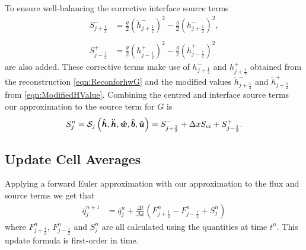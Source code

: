 To ensure well-balancing the corrective interface source terms
	\begin{align*}
	 S^{-}_{j + \frac{1}{2}} &=  \frac{g}{2} \left(\ddot{h}^{-}_{j + \frac{1}{2}} \right)^2 - \frac{g}{2} \left(h^{-}_{j + \frac{1}{2}} \right)^2, \\ \\
	  S^{+}_{j - \frac{1}{2}} &=  \frac{g}{2} \left(h^{+}_{j - \frac{1}{2}}\right)^2 - \frac{g}{2}\left(\ddot{h}^{+}_{j - \frac{1}{2}}\right)^2 
	\end{align*}
are also added. These corrective terms make use of $h^{-}_{j + \frac{1}{2}}$ and $h^{+}_{j + \frac{1}{2}}$ obtained from the reconstruction \eqref{eqn:ReconforhwG} and the modified values $\ddot{h}^{-}_{j + \frac{1}{2}}$ and $\ddot{h}^{+}_{j + \frac{1}{2}}$ from \eqref{eqn:ModifiedHValue}. Combining the centred and interface source terms our approximation to the source term for $G$ is 
\begin{equation*}
S^n_j = \mathcal{S}_j\left( \boldsymbol{\hat{h}},\boldsymbol{\ddot{h}},\boldsymbol{\hat{w}},\boldsymbol{\hat{b}}, \boldsymbol{\hat{u}}  \right)=   S^{-}_{j + \frac{1}{2}} + \Delta x S_{ci} + S^{+}_{j - \frac{1}{2}}.
\end{equation*}


\subsection{Update Cell Averages}
Applying a forward Euler approximation with our approximation to the flux and source terms we get that
\begin{align}
\overline{q}^{n+1}_j &= \overline{q}^{n}_j + \frac{\Delta t}{\Delta x} \left(F^n_{j+\frac{1}{2}} - F^n_{j-\frac{1}{2}} + S^n_j\right)
\label{eqn:UpdateMethod}
\end{align}
where $F^n_{j+\frac{1}{2}}$, $F^n_{j-\frac{1}{2}}$ and $S^n_j$ are all calculated using the quantities at time $t^n$. This update formula is first-order in time.


